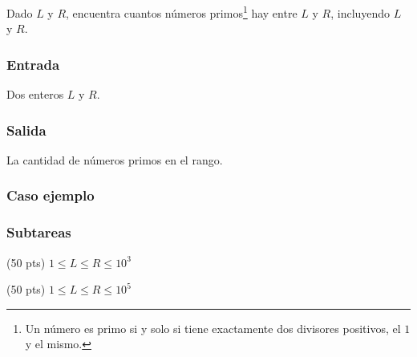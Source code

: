 Dado \(L\) y \(R\), encuentra cuantos números primos\footnote{Un número es primo si y solo si tiene exactamente dos divisores positivos, el \(1\) y el mismo.} hay entre \(L\) y \(R\), incluyendo \(L\) y \(R\).


\subsubsection*{Entrada}
Dos enteros \(L\) y \(R\).
\subsubsection*{Salida}
La cantidad de números primos en el rango.
\subsubsection{Caso ejemplo}
\begin{casebox3}
\end{casebox3}

\subsubsection*{Subtareas}
\begin{plimits}
	\item (50 pts) \(1\leq L\leq R\leq 10^3\)
	\item (50 pts) \(1\leq L\leq R\leq 10^5\)
\end{plimits}

